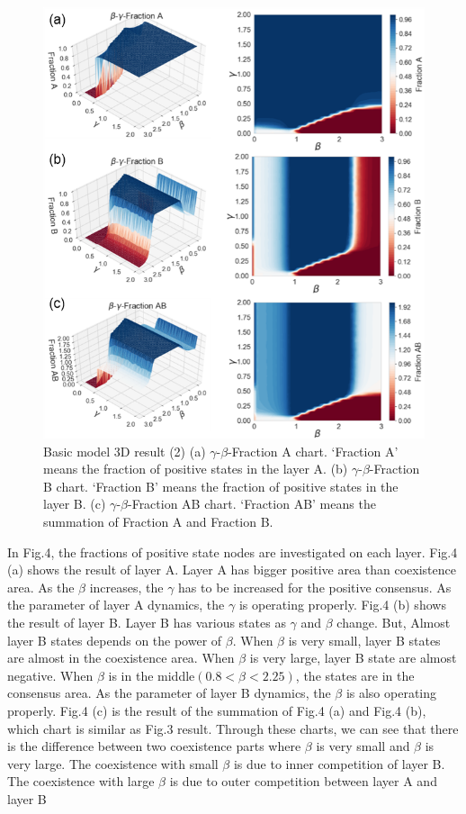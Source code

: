 \documentclass[english]{cccconf}
\begin{document}
\begin{figure}[!htb]
  \centering
  \includegraphics[width=\hsize]{FIG4.png}
  \caption{Basic model 3D result (2) (a) $\gamma$-$\beta$-Fraction A chart. ‘Fraction A’ means the fraction of positive states in the layer A. (b) $\gamma$-$\beta$-Fraction B chart. ‘Fraction B’ means the fraction of positive states in the layer B. (c) $\gamma$-$\beta$-Fraction AB chart. ‘Fraction AB’ means the summation of Fraction A and Fraction B.}
  \label{Fig4}
\end{figure}
In Fig.4, the fractions of positive state nodes are investigated on each layer. Fig.4 (a) shows the result of layer A. Layer A has bigger positive area than coexistence area. As the $\beta$ increases, the $\gamma$ has to be increased for the positive consensus. As the parameter of layer A dynamics, the $\gamma$ is operating properly. Fig.4 (b) shows the result of layer B. Layer B has various states as $\gamma$ and $\beta$ change. But, Almost layer B states depends on the power of $\beta$.  When $\beta$ is very small, layer B states are almost in the coexistence area. When $\beta$ is very large, layer B state are almost negative. When $\beta$ is in the middle$(0.8 < \beta < 2.25)$, the states are in the consensus area. As the parameter of layer B dynamics, the $\beta$ is also operating properly. Fig.4 (c) is the result of the summation of Fig.4 (a) and Fig.4 (b), which chart is similar as Fig.3 result. Through these charts, we can see that there is the difference between two coexistence parts where $\beta$ is very small and $\beta$ is very large. The coexistence with small $\beta$ is due to inner competition of layer B. The coexistence with large $\beta$ is due to outer competition between layer A and layer B
\end{document}
